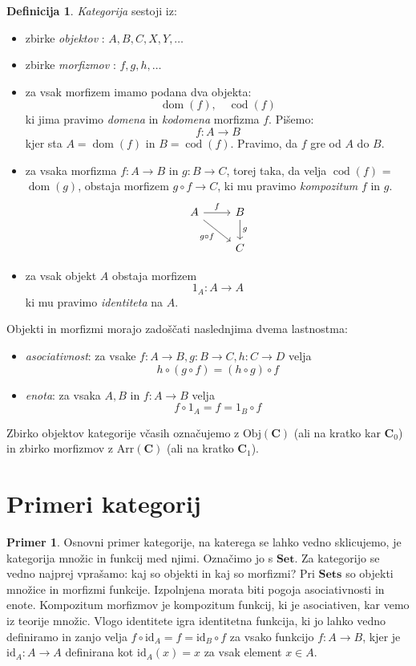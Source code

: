 \documentclass[12pt,a4paper]{book}
\theoremstyle{definition}
\newtheorem{definicija}{Definicija}[chapter]
\theoremstyle{plain}
\theoremstyle{definition}
\newtheorem{primer}{Primer}[section]
\theoremstyle{remark}
\newcommand{\cat}[1]{\textbf{#1}}
\DeclareMathOperator{\dom}{dom}
\DeclareMathOperator{\cod}{cod}
\begin{document}
\begin{definicija}
\emph{Kategorija} sestoji iz:
\begin{itemize}
\item zbirke \emph{objektov} : $A,B,C,X,Y,\ldots$
\item zbirke \emph{morfizmov} : $f,g,h,\ldots$
\item za vsak morfizem imamo podana dva objekta: 
$$\dom(f), \quad \cod(f)$$
ki jima pravimo \emph{domena} in \emph{kodomena} morfizma $f$. Pišemo:
$$f\colon A \to B$$
kjer sta $A = \dom(f)$ in $B = \cod(f)$.
Pravimo, da $f$ gre od $A$ do $B$.
\item za vsaka morfizma $f \colon A \to B$ in $g \colon B \to C$, torej taka, da velja $\cod(f)$ = $\dom(g)$, obstaja morfizem $g\circ f \to C$, ki mu pravimo \emph{kompozitum} $f$ in $g$.
%
\[
\begin{tikzcd}
A \arrow[r, "f"] \arrow[rd, "g \circ f"']  & B  \arrow[d, "g"] \\
				& C
\end{tikzcd}
\] 
%
\item za vsak objekt $A$ obstaja morfizem
$$1_A : A \to A$$
ki mu pravimo \emph{identiteta} na $A$.		
\end{itemize}
Objekti in morfizmi morajo zadoščati naslednjima dvema lastnostma:
\begin{itemize}
\item \emph{asociativnost}: za vsake $f : A \to B, g : B \to C, h : C \to D$ velja
$$h \circ (g \circ f) = (h \circ g) \circ f$$
\item \emph{enota}: za vsaka $A,B$ in $f : A \to B$ velja
$$f \circ 1_A = f = 1_B \circ f$$
\end{itemize}
\end{definicija}
%
Zbirko objektov kategorije včasih označujemo z $\mathrm{Obj}(\cat{C})$ (ali na kratko kar $\cat{C}_0$) in zbirko morfizmov z $\mathrm{Arr}(\cat{C})$ (ali na kratko $\cat{C}_1$).

\section{Primeri kategorij}

\begin{primer}
Osnovni primer kategorije, na katerega se lahko vedno sklicujemo, je kategorija množic in funkcij med njimi. Označimo jo s $\cat{Set}$. Za kategorijo se vedno najprej vprašamo: kaj so objekti in kaj so morfizmi? Pri $\cat{Sets}$ so objekti množice in morfizmi funkcije.
Izpolnjena morata biti pogoja asociativnosti in enote.
Kompozitum morfizmov je kompozitum funkcij, ki je asociativen, kar vemo iz teorije množic.
Vlogo identitete igra identitetna funkcija, ki jo lahko vedno definiramo in zanjo velja $f \circ \mathrm{id}_A = f = \mathrm{id}_B \circ f$ za vsako funkcijo $f : A \to B$, kjer je $\mathrm{id}_A : A \to A$ definirana kot $\mathrm{id}_A(x) = x$ za vsak element $x \in A$.
\end{primer}
\end{document}
